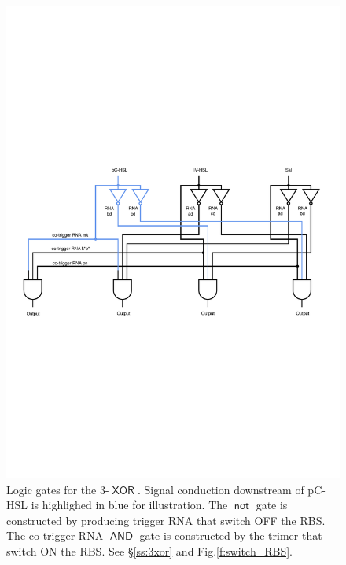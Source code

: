 \documentclass[12pt,notitlepage]{article}
\newcommand{\NOT}{\ensuremath{\mathop{\mathsf{not}}}\xspace}
\newcommand{\AND}{\ensuremath{\mathop{\mathsf{AND}}}\xspace}
\newcommand{\XOR}{\ensuremath{\mathop{\mathsf{XOR}}}\xspace}
\newcommand{\hh}[1]{{\color{Purple}#1}}
\begin{document}
%
\begin{figure}
    \centering
    \includegraphics[width = \linewidth]{xor_ribocomputing/logic_gate_3xor}
    \caption{
    \hh{
    Logic gates for the 3-\XOR . Signal conduction downstream of pC-HSL is highlighed in blue for illustration. The \NOT gate is constructed by producing trigger RNA that switch OFF the RBS. The co-trigger RNA \AND gate is constructed by the trimer that switch ON the RBS. See \S\ref{ss:3xor} and Fig.\ref{f:switch_RBS}.
    }
    }
    \label{f:logical_gates_3xor}
\end{figure}
%
\end{document}
